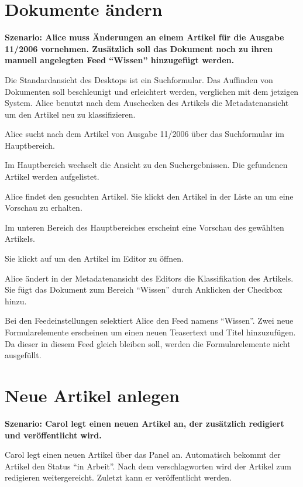 \section{Dokumente ändern}

\textbf{Szenario: Alice muss Änderungen an einem Artikel für die Ausgabe 11/2006
vornehmen. Zusätzlich soll das Dokument noch zu ihren manuell 
angelegten Feed "`Wissen"' hinzugefügt werden.}

Die Standardansicht des Desktops ist ein Suchformular. Das Auf\/finden von
Dokumenten soll beschleunigt und erleichtert werden, verglichen mit dem
jetzigen System. Alice benutzt nach dem Auschecken des Artikels die
Metadatenansicht um den Artikel neu zu klassifizieren.

\begin{compactenum}
  \item Alice sucht nach dem Artikel von Ausgabe 11/2006 über das
  Suchformular im Hauptbereich.
  \item Im Hauptbereich wechselt die Ansicht zu den Suchergebnissen. Die
  gefundenen Artikel werden aufgelistet.
  \item Alice findet den gesuchten Artikel. Sie klickt den Artikel in
  der Liste an um eine Vorschau zu erhalten.
  \item Im unteren Bereich des Hauptbereiches erscheint eine Vorschau
  des gewählten Artikels.
  \item Sie klickt auf  um den Artikel im Editor 
  zu öffnen.
  \item Alice ändert in der Metadatenansicht des Editors die
  Klassifikation des Artikels. Sie fügt das Dokument zum Bereich
  "`Wissen"' durch Anklicken der Checkbox hinzu.
  \item Bei den Feedeinstellungen selektiert Alice den Feed namens 
  "`Wissen"'. Zwei neue Formularelemente erscheinen um einen neuen 
  Teasertext und Titel hinzuzufügen. Da dieser in diesem Feed gleich 
  bleiben soll, werden die Formularelemente nicht ausgefüllt.
\end{compactenum}


\section{Neue Artikel anlegen}
\textbf{Szenario: Carol legt einen neuen Artikel an, der zusätzlich 
redigiert und veröffentlicht wird.}

Carol legt einen neuen Artikel über das  Panel an. Automatisch bekommt der Artikel den Status "`in 
Arbeit"'. Nach dem verschlagworten wird der Artikel zum redigieren 
weitergereicht. Zuletzt kann er veröffentlicht werden.

